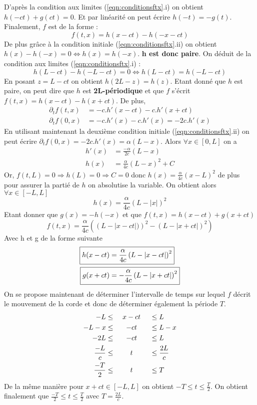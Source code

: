 \documentclass[12pt]{article}
\newcommand*\centermathcell[1]{\omit\hfil$\displaystyle#1$\hfil\ignorespaces}
\begin{document}
D'après la condition aux limites (\ref{eqn:conditionsftx}.i) on obtient $h(-ct)+g(ct)=0$. Et par linéarité on peut écrire $h(-t)=-g(t)$. Finalement, $f$ est de la forme :
\begin{equation*}
	f(t,x)=h(x-ct)-h(-x-ct)
\end{equation*}
De plus grâce à la condition initiale (\ref{eqn:conditionsftx}.ii) on obtient $h(x)-h(-x)=0 \Longleftrightarrow h(x)=h(-x)$. \textbf{h est donc paire}. On déduit de la condition aux limites (\ref{eqn:conditionsftx}.i) :
\begin{equation*}
	h(L-ct)-h(-L-ct)=0 \Longleftrightarrow h(L-ct)=h(-L-ct)
\end{equation*}
En posant $z=L-ct$ on obtient $h(2L-z)=h(z)$. Etant donné que $h$ est paire, on peut dire  que $h$ est \textbf{2L-périodique} et que $f$ s'écrit $f(t,x)=h(x-ct)-h(x+ct)$. De plus,
\begin{align*}
	\partial_{t}f(t,x)	&=-c.h'(x-ct)-c.h'(x+ct) \\
	\partial_{t}f(0,x)	&=-c.h'(x)-c.h'(x)=-2c.h'(x)
\end{align*}
En utilisant maintenant la deuxième condition initiale (\ref{eqn:conditionsftx}.ii) on peut écrire $\partial_{t}f(0,x)=-2c.h'(x)=\alpha(L-x)$. Alors $\forall x \in [0,L]$ on a
\begin{align*}
	h'(x)	&=\frac{-\alpha}{2c}(L-x) \\
	h(x)		&=\frac{\alpha}{4c}(L-x)^2+C
\end{align*}
Or, $f(t,L)=0 \Longrightarrow h(L)=0 \Longrightarrow C=0$ donc $h(x)=\frac{\alpha}{4c}(x-L)^2$ de plus pour assurer la partié de $h$ on absolutise la variable. On obtient alors $\forall x \in [-L,L]$
\begin{equation*}
	h(x)=\frac{\alpha}{4c}(L- \lvert x \rvert )^2
\end{equation*}
Etant donner que $g(x)=-h(-x)$ et que $f(t,x)=h(x-ct)+g(x+ct)$
\begin{equation*}
f(t,x)=\frac{\alpha}{4c}\left( \left( L-\lvert x-ct \rvert)\right)^2-\left(L-\lvert x+ct \rvert \right)^2\right)
\end{equation*}
Avec h et g de la forme suivante
\begin{align}
	\Aboxed{h(x-ct) &= \frac{\alpha}{4c}\left(L-\lvert x-ct \rvert \right)^2} \\
	\Aboxed{g(x+ct) &= -\frac{\alpha}{4c}\left(L-\lvert x+ct \rvert \right)^2}
\end{align}
On se propose maintenant de déterminer l'intervalle de temps sur lequel $f$ décrit le mouvement de la corde et donc de déterminer également la période $T$.
\begin{alignat*}{4}
	-L 			&\leq && \ x-ct \				&&\leq L \\
	-L-x 		&\leq && \centermathcell{-ct}	&&\leq L-x \\
	-2L 			&\leq && \centermathcell{-ct}	&&\leq L \\
	\frac{-L}{c}	&\leq && \centermathcell{t}		&&\leq \frac{2L}{c} \\
	\frac{-T}{2}	&\leq && \centermathcell{t}		&&\leq T
\end{alignat*}
De la même manière pour $x+ct \in [-L,L]$ on obtient $-T \leq t \leq \frac{T}{2}$. On obtient finalement que $\frac{-T}{2} \leq t \leq \frac{T}{2}$ avec $T=\frac{2L}{c}$.
\newpage
\end{document}
